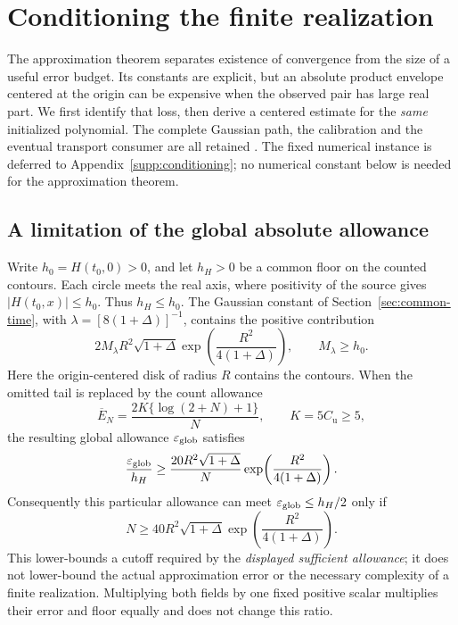 \section{Conditioning the finite realization}
\label{sec:conditioning}

The approximation theorem separates existence of convergence from the
size of a useful error budget. Its constants are explicit, but an
absolute product envelope centered at the origin can be expensive when
the observed pair has large real part. We first identify that loss,
then derive a centered estimate for the \emph{same} initialized
polynomial. The complete Gaussian path, the calibration and the
eventual transport consumer are all retained
\cite{BakerCM50,BakerCM51}. The fixed numerical instance is deferred to
Appendix~\ref{supp:conditioning}; no numerical constant below is needed
for the approximation theorem.

\subsection{A limitation of the global absolute allowance}

Write $h_0=H(t_0,0)>0$, and let $h_H>0$ be a common floor on the
counted contours. Each circle meets the real axis, where positivity of
the source gives $|H(t_0,x)|\le h_0$. Thus $h_H\le h_0$.
The Gaussian constant of Section~\ref{sec:common-time}, with
$\lambda=[8(1+\Delta)]^{-1}$, contains the positive contribution
\[
 2M_\lambda R^2\sqrt{1+\Delta}
       \exp\!\left(\frac{R^2}{4(1+\Delta)}\right),
 \qquad M_\lambda\ge h_0.
\]
Here the origin-centered disk of radius $R$ contains the contours.
When the omitted tail is replaced by the count allowance
\[
 \overline E_N=\frac{2K\{\log(2+N)+1\}}{N},
 \qquad K=5C_{\mathrm u}\ge5,
\]
the resulting global allowance $\varepsilon_{\rm glob}$ satisfies
\begin{equation}
 \frac{\varepsilon_{\rm glob}}{h_H}
 \ge \frac{20R^2\sqrt{1+\Delta}}{N}
          \exp\!\left(\frac{R^2}{4(1+\Delta)}\right).
 \label{cond:global-screen}
\end{equation}
Consequently this particular allowance can meet
$\varepsilon_{\rm glob}\le h_H/2$ only if
\[
 N\ge40R^2\sqrt{1+\Delta}
          \exp\!\left(\frac{R^2}{4(1+\Delta)}\right).
\]
This lower-bounds a cutoff required by the \emph{displayed sufficient
allowance}; it does not lower-bound the actual approximation error or
the necessary complexity of a finite realization. Multiplying both
fields by one fixed positive scalar multiplies their error and floor
equally and does not change this ratio.

